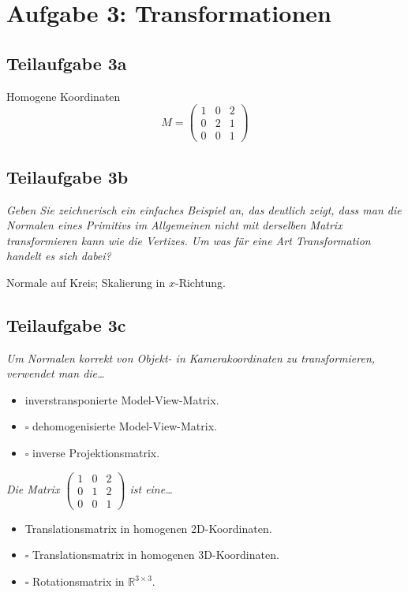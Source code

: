 \documentclass[a4paper]{scrartcl}
\begin{document}
\section*{Aufgabe 3: Transformationen}
\subsection*{Teilaufgabe 3a}
Homogene Koordinaten
\[M = \begin{pmatrix}1 & 0 & 2\\
                     0 & 2 & 1\\
                     0 & 0 & 1\end{pmatrix}\]

\subsection*{Teilaufgabe 3b}
\textit{Geben Sie zeichnerisch ein einfaches Beispiel an, das deutlich zeigt,
dass man die Normalen eines Primitivs im Allgemeinen nicht mit derselben Matrix
transformieren kann wie die Vertizes. Um was für eine Art Transformation
handelt es sich dabei?}

Normale auf Kreis; Skalierung in $x$-Richtung.

\subsection*{Teilaufgabe 3c}
\textit{Um Normalen korrekt von Objekt- in Kamerakoordinaten zu transformieren, verwendet man die\dots}
\begin{itemize}
    \item \CheckedBox inverstransponierte Model-View-Matrix.
    \item $\square$ dehomogenisierte Model-View-Matrix.
    \item $\square$ inverse Projektionsmatrix.
\end{itemize}

\textit{Die Matrix $\begin{pmatrix}1 & 0 & 2\\
                     0 & 1 & 2\\
                     0 & 0 & 1\end{pmatrix}$ ist eine\dots}
\begin{itemize}
    \item \CheckedBox Translationsmatrix in homogenen 2D-Koordinaten.
    \item $\square$ Translationsmatrix in homogenen 3D-Koordinaten.
    \item $\square$ Rotationsmatrix in $\mathbb{R}^{3 \times 3}$.
\end{itemize}
\end{document}
